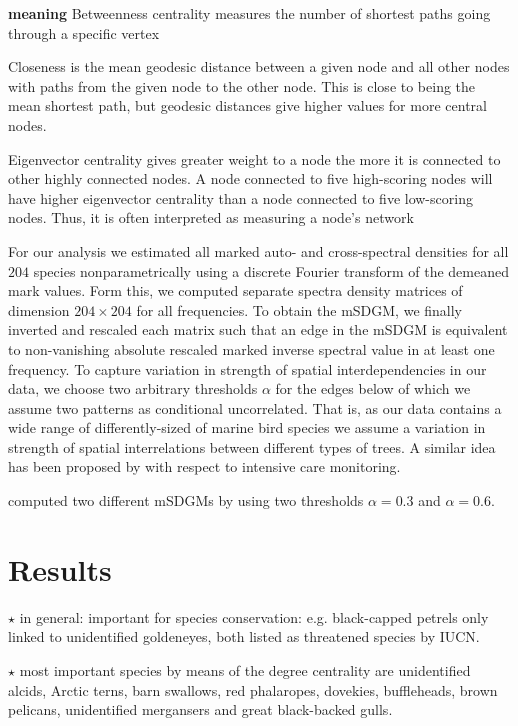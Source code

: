 \documentclass{statsoc}
\begin{document}
\textbf{meaning}
 Betweenness centrality measures the number of shortest paths
going through a specific vertex

Closeness is the mean geodesic distance between a given node and
 all other nodes with paths from the given node to the other
 node. This is close to being the mean shortest path, but 
geodesic distances give higher values for more central nodes.

 Eigenvector centrality gives greater weight to a node the more 
 it is connected to other highly connected nodes. A node
 connected to five high-scoring nodes will have higher 
 eigenvector centrality than a node connected to five low-scoring
 nodes. Thus, it is often interpreted as measuring a node's
 network 



For our analysis we estimated all marked auto- and cross-spectral densities for all $204$ species nonparametrically using a discrete Fourier transform of the demeaned mark values. Form this, we computed separate spectra density matrices of dimension $204 \times 204$ for all frequencies. To obtain the mSDGM, we finally inverted and rescaled each matrix such that an edge in the mSDGM is equivalent to non-vanishing absolute rescaled marked inverse spectral value in at least one frequency. To capture variation in strength of spatial interdependencies in our data, we choose two arbitrary thresholds $\alpha$ for the edges below of which we assume two patterns as conditional uncorrelated. That is, as our data contains a wide range of differently-sized of marine bird species we assume a variation in strength of spatial interrelations between different types of trees. A similar idea has been proposed by \cite{GatherImhoffFried2002} with respect to intensive care monitoring.


computed two different mSDGMs by using two thresholds $\alpha=0.3$ and $\alpha=0.6$. 




\section{Results}

$\star$ in general: important for species conservation: e.g. black-capped petrels only linked to unidentified goldeneyes, both listed as threatened species by IUCN. 


$\star$ most important species by means of the degree centrality are unidentified alcids, Arctic terns, barn swallows, red phalaropes, dovekies, buffleheads, brown pelicans, unidentified mergansers and great black-backed gulls.
\end{document}
